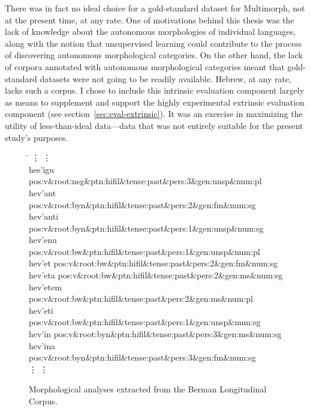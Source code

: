 There was in fact no ideal choice for a gold-standard dataset for Multimorph, 
not at the present time, at any rate. One of motivations behind this 
thesis was the lack of knowledge about the autonomous morphologies 
of individual languages, along with the notion that unsupervised learning could contribute to the 
process of discovering autonomous morphological categories. On the other hand, the lack
of corpora annotated with autonomous morphological categories meant 
that gold-standard datasets were not going to be readily available. Hebrew, at any rate,
lacks such a corpus. 
I chose to include this intrinsic evaluation component largely as means 
to supplement and support the highly experimental extrinsic evaluation 
component (see section~\ref{sec:eval-extrinsic}).  It was an exercise in maximizing the utility of less-than-ideal 
data---data that was not entirely
suitable for the present study's purposes.

\begin{figure}[t]
\begin{mdframed}
\begin{tabbing}
\hspace{1in} \= \hspace{5.5in} \kill
\vdots \> \vdots \\
hes\a'{i}gu \> pos:v\&root:nsg\&ptn:hifil\&tense:past\&pers:3\&gen:unsp\&num:pl \\
hev\a'{a}nt \> pos:v\&root:byn\&ptn:hifil\&tense:past\&pers:2\&gen:fm\&num:sg \\
hev\a'{a}nti \> pos:v\&root:byn\&ptn:hifil\&tense:past\&pers:1\&gen:unsp\&num:sg \\
hev\a'{e}nu \> pos:v\&root:bw\&ptn:hifil\&tense:past\&pers:1\&gen:unsp\&num:pl \\
hev\a'{e}t \> pos:v\&root:bw\&ptn:hifil\&tense:past\&pers:2\&gen:fm\&num:sg \\
hev\a'{e}ta \> pos:v\&root:bw\&ptn:hifil\&tense:past\&pers:2\&gen:ms\&num:sg \\
hev\a'{e}tem \> pos:v\&root:bw\&ptn:hifil\&tense:past\&pers:2\&gen:ms\&num:pl \\
hev\a'{e}ti \> pos:v\&root:bw\&ptn:hifil\&tense:past\&pers:1\&gen:unsp\&num:sg \\
hev\a'{i}n \> pos:v\&root:byn\&ptn:hifil\&tense:past\&pers:3\&gen:ms\&num:sg \\
hev\a'{i}na \> pos:v\&root:byn\&ptn:hifil\&tense:past\&pers:3\&gen:fm\&num:sg \\
\vdots \> \vdots \\
\end{tabbing}
\label{fig:verb-analyses}
\caption{Morphological analyses extracted from the Berman Longitudinal Corpus.}
\end{mdframed}
\end{figure}

